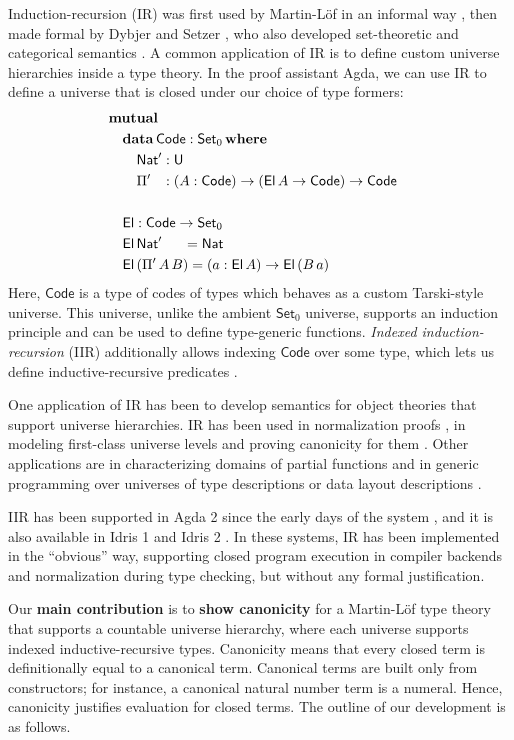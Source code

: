 \documentclass[acmsmall,screen,review,anonymous]{acmart}
\newcommand{\msf}[1]{{\mathsf{#1}}}
\newcommand{\mbf}[1]{{\mathbf{#1}}}
\newcommand{\data}{\mbf{data}}
\newcommand{\U}{\msf{U}}
\newcommand{\Set}{\msf{Set}}
\newcommand{\where}{\mbf{where}}
\newcommand{\Nat}{\msf{Nat}}
\newcommand{\El}{\msf{El}}
\newcommand{\Code}{\msf{Code}}
\begin{document}
Induction-recursion (IR) was first used by Martin-Löf in an informal way \cite{TODO}, then made
formal by Dybjer and Setzer \cite{TODO}, who also developed set-theoretic and categorical semantics
\cite{TODO}. A common application of IR is to define custom universe hierarchies inside a type
theory. In the proof assistant Agda, we can use IR to define a universe that is closed under our
choice of type formers:
\begin{alignat*}{3}
  & \mbf{mutual} \\
  & \quad\data\,\Code : \Set_0\,\where \\
  & \quad\quad \Nat' : \U\\
  & \quad\quad \Pi' \hspace{0.8em} : (A : \Code) \to (\El\,A \to \Code) \to \Code
  & \\
  & \\
  & \quad\El : \Code \to \Set_0 \\
  & \quad\El\,\Nat'\hspace{1.5em}  = \Nat \\
  & \quad\El\,(\Pi'\,A\,B) = (a : \El\,A) \to \El\,(B\,a)
\end{alignat*}
Here, $\Code$ is a type of codes of types which behaves as a custom Tarski-style universe. This
universe, unlike the ambient $\Set_0$ universe, supports an induction principle and can be used to
define type-generic functions. \emph{Indexed induction-recursion} (IIR) additionally allows indexing
$\Code$ over some type, which lets us define inductive-recursive predicates \cite{TODO}.

One application of IR has been to develop semantics for object theories that support universe
hierarchies. IR has been used in normalization proofs \cite{TODO}, in modeling first-class universe
levels \cite{TODO} and proving canonicity for them \cite{TODO}. Other applications are in
characterizing domains of partial functions \cite{TODO} and in generic programming over universes of
type descriptions or data layout descriptions \cite{TODO}.

IIR has been supported in Agda 2 since the early days of the system \cite{TODO}, and it is also
available in Idris 1 and Idris 2 \cite{TODO}. In these systems, IR has been implemented in the
``obvious'' way, supporting closed program execution in compiler backends and normalization during
type checking, but without any formal justification.

Our \textbf{main contribution} is to \textbf{show canonicity} for a Martin-Löf type theory that
supports a countable universe hierarchy, where each universe supports indexed inductive-recursive
types. Canonicity means that every closed term is definitionally equal to a canonical
term. Canonical terms are built only from constructors; for instance, a canonical natural number
term is a numeral. Hence, canonicity justifies evaluation for closed terms. The outline of our
development is as follows.
\end{document}
